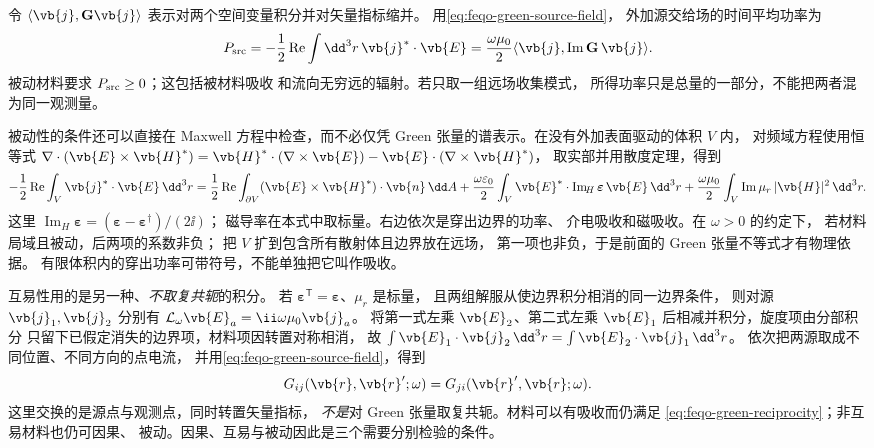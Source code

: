 令 \(\langle\vb{j},\mathbf G\vb{j}\rangle\)
表示对两个空间变量积分并对矢量指标缩并。
用\cref{eq:feqo-green-source-field}，
外加源交给场的时间平均功率为
\[
P_{\rm src}
=-\frac12\operatorname{Re}\int\dd^3r\,
\vb{j}^*\cdot\vb{E}
=\frac{\omega\mu_0}{2}
\langle\vb{j},\operatorname{Im}\mathbf G\,\vb{j}\rangle.
\]
被动材料要求 \(P_{\rm src}\ge0\)；这包括被材料吸收
和流向无穷远的辐射。若只取一组远场收集模式，
所得功率只是总量的一部分，不能把两者混为同一观测量。

被动性的条件还可以直接在 Maxwell 方程中检查，而不必仅凭
Green 张量的谱表示。在没有外加表面驱动的体积 \(V\) 内，
对频域方程使用恒等式
\(\nabla\cdot(\vb{E}\times\vb{H}^*)
=\vb{H}^*\cdot(\nabla\times\vb{E})
-\vb{E}\cdot(\nabla\times\vb{H}^*)\)，
取实部并用散度定理，得到
\[
-\frac12\operatorname{Re}\int_V
\vb{j}^*\cdot\vb{E}\,\dd^3r
=\frac12\operatorname{Re}\int_{\partial V}
(\vb{E}\times\vb{H}^*)\cdot\vb{n}\,\dd A
+\frac{\omega\varepsilon_0}{2}\int_V
\vb{E}^*\cdot\operatorname{Im}_{\!H}
\boldsymbol\varepsilon\,\vb{E}\,\dd^3r
+\frac{\omega\mu_0}{2}\int_V
\operatorname{Im}\mu_r\,|\vb{H}|^2\,\dd^3r .
\]
这里 \(\operatorname{Im}_{\!H}\boldsymbol\varepsilon
=(\boldsymbol\varepsilon-\boldsymbol\varepsilon^\dagger)/(2\ii)\)；
磁导率在本式中取标量。右边依次是穿出边界的功率、
介电吸收和磁吸收。在 \(\omega>0\) 的约定下，
若材料局域且被动，后两项的系数非负；
把 \(V\) 扩到包含所有散射体且边界放在远场，
第一项也非负，于是前面的 Green 张量不等式才有物理依据。
有限体积内的穿出功率可带符号，不能单独把它叫作吸收。

互易性用的是另一种、\emph{不取复共轭}的积分。
若 \(\boldsymbol\varepsilon^\mathsf T
=\boldsymbol\varepsilon\)、\(\mu_r\) 是标量，
且两组解服从使边界积分相消的同一边界条件，
则对源 \(\vb{j}_1,\vb{j}_2\) 分别有
\(\mathcal L_\omega\vb{E}_a=\ii\omega\mu_0\vb{j}_a\)。
将第一式左乘 \(\vb{E}_2\)、第二式左乘
\(\vb{E}_1\) 后相减并积分，旋度项由分部积分
只留下已假定消失的边界项，材料项因转置对称相消，
故
\(\int\vb{E}_1\cdot\vb{j}_2\,\dd^3r
=\int\vb{E}_2\cdot\vb{j}_1\,\dd^3r\)。
依次把两源取成不同位置、不同方向的点电流，
并用\cref{eq:feqo-green-source-field}，得到
\begin{equation}
G_{ij}(\vb{r},\vb{r}';\omega)
=G_{ji}(\vb{r}',\vb{r};\omega).
\label{eq:feqo-green-reciprocity}
\end{equation}
这里交换的是源点与观测点，同时转置矢量指标，
\emph{不是}对 Green 张量取复共轭。材料可以有吸收而仍满足
\cref{eq:feqo-green-reciprocity}；非互易材料也仍可因果、
被动。因果、互易与被动因此是三个需要分别检验的条件。

